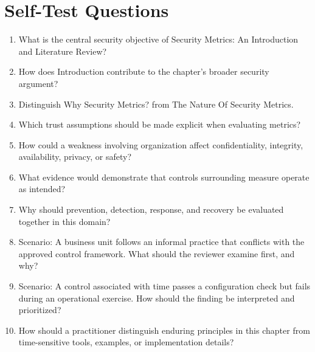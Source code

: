 \documentclass[11pt]{article}
\begin{document}
\section*{Self-Test Questions}
\begin{enumerate}
\item What is the central security objective of Security Metrics: An Introduction and Literature Review?
\item How does Introduction contribute to the chapter's broader security argument?
\item Distinguish Why Security Metrics? from The Nature Of Security Metrics.
\item Which trust assumptions should be made explicit when evaluating metrics?
\item How could a weakness involving organization affect confidentiality, integrity, availability, privacy, or safety?
\item What evidence would demonstrate that controls surrounding measure operate as intended?
\item Why should prevention, detection, response, and recovery be evaluated together in this domain?
\item Scenario: A business unit follows an informal practice that conflicts with the approved control framework. What should the reviewer examine first, and why?
\item Scenario: A control associated with time passes a configuration check but fails during an operational exercise. How should the finding be interpreted and prioritized?
\item How should a practitioner distinguish enduring principles in this chapter from time-sensitive tools, examples, or implementation details?
\end{enumerate}
\end{document}
